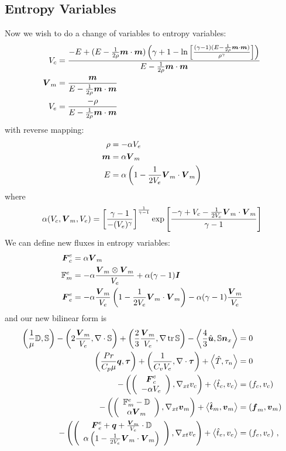 \documentclass{article}
\begin{document}
\subsection*{Entropy Variables}
Now we wish to do a change of variables to entropy variables:
\begin{align*}
V_c&=\frac{-E+(E-\frac{1}{2\rho}\boldsymbol m\cdot\boldsymbol m)\left( \gamma+1-\ln\left[ \frac{(\gamma-1)(E-\frac{1}{2\rho}\boldsymbol m\cdot\boldsymbol m)}{\rho^\gamma} \right] \right)}
{E-\frac{1}{2\rho}\boldsymbol m\cdot\boldsymbol m}\\
\boldsymbol V_m&=\frac{\boldsymbol m}{E-\frac{1}{2\rho}\boldsymbol m\cdot\boldsymbol m}\\
V_e&=\frac{-\rho}{E-\frac{1}{2\rho}\boldsymbol m\cdot\boldsymbol m}\\
\end{align*}
with reverse mapping:
\begin{align*}
\rho&=-\alpha V_e\\
\boldsymbol m&=\alpha\boldsymbol V_m\\
E&=\alpha\left( 1-\frac{1}{2V_e}\boldsymbol V_m\cdot\boldsymbol V_m \right)\\
\end{align*}
where 
\[
\alpha(V_c,\boldsymbol V_m,V_e)=\left[ \frac{\gamma-1}{-(V_e)^\gamma} \right]^{\frac{1}{\gamma-1}}\exp\left[ \frac{-\gamma+V_c-\frac{1}{2V_e}\boldsymbol V_m\cdot\boldsymbol V_m}{\gamma-1} \right]
\]
We can define new fluxes in entropy variables:
\begin{align*}
\boldsymbol F^e_c&=\alpha\boldsymbol V_m\\
\mathbb{F}^e_m&=-\alpha\frac{\boldsymbol V_m\otimes\boldsymbol V_m}{V_e}+\alpha(\gamma-1)\boldsymbol I\\
\boldsymbol F^e_e&=-\alpha\frac{\boldsymbol V_m}{V_e}\left( 1-\frac{1}{2V_e}\boldsymbol V_m\cdot\boldsymbol V_m \right)-\alpha(\gamma-1)\frac{\boldsymbol V_m}{V_e}\\
\end{align*}
and our new bilinear form is
\begin{subequations}
\label{eq:entropyBF}
\begin{align}
	\left( \frac{1}{\mu}\mathbb{D},\mathbb{S} \right)-\left( 2\frac{\boldsymbol V_m}{V_e},\nabla\cdot\mathbb{S} \right)+\left( \frac{2}{3}\frac{\boldsymbol V_m}{V_e},\nabla\operatorname*{tr}{\mathbb{S}} \right)
	-\left\langle \frac{4}{3}\hat{\boldsymbol u},\mathbb{S}\boldsymbol n_x \right\rangle&=0\\
	\left( \frac{Pr}{C_p\mu}\boldsymbol q,\boldsymbol\tau \right)+\left( \frac{1}{C_vV_e},\nabla\cdot\boldsymbol\tau \right)+\left\langle \hat T,\tau_n \right\rangle&=0\\
	-\left( \left( \begin{array}{c} \boldsymbol F^e_c\\ -\alpha V_e\\ \end{array} \right),\nabla_{xt} v_c \right)+\left\langle \hat t_c,v_c \right\rangle&=\left( f_c,v_c \right)\\
	-\left( \left( \begin{array}{c} \mathbb{F}^e_m-\mathbb{D}\\ \alpha\boldsymbol V_m\\ \end{array} \right),\nabla_{xt}\boldsymbol v_m \right)+\left\langle \hat{\boldsymbol t}_m,\boldsymbol v_m \right\rangle&=\left( \boldsymbol f_m,\boldsymbol v_m \right)\\
	-\left( \left( \begin{array}{c} \boldsymbol F^e_e+\boldsymbol q+\frac{\boldsymbol V_m}{V_e}\cdot\mathbb{D}\\ \alpha\left( 1-\frac{1}{2V_e}\boldsymbol V_m\cdot\boldsymbol V_m \right)\\ \end{array} \right),\nabla_{xt} v_e \right)
	+\left\langle \hat t_e,v_e \right\rangle&=\left( f_e,v_e \right)\,,
\end{align}
\end{subequations}
\end{document}
